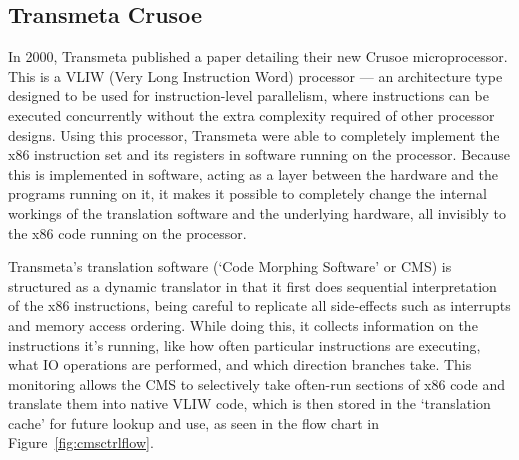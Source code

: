 \subsection{Transmeta Crusoe}
In 2000, Transmeta published a paper detailing their new Crusoe microprocessor.
This is a VLIW (Very Long Instruction Word) processor --- an architecture type
designed to be used for instruction-level parallelism, where instructions can be
executed concurrently without the extra complexity required of other processor
designs. Using this processor, Transmeta were able to completely implement the
x86 instruction set and its registers in software running on the processor.
Because this is implemented in software, acting as a layer between the hardware
and the programs running on it, it makes it possible to completely change the
internal workings of the translation software and the underlying hardware, all
invisibly to the x86 code running on the processor.

Transmeta's translation software (`Code Morphing Software' or CMS) is structured
as a dynamic translator in that it first does sequential interpretation of the
x86 instructions, being careful to replicate all side-effects such as
interrupts and memory access ordering. While doing this, it collects information
on the instructions it's running, like how often particular instructions are
executing, what IO operations are performed, and which direction branches take.
This monitoring allows the CMS to selectively take often-run sections of x86
code and translate them into native VLIW code, which is then stored in the
`translation cache' for future lookup and use, as seen in the flow chart in
Figure~\ref{fig:cmsctrlflow}.

